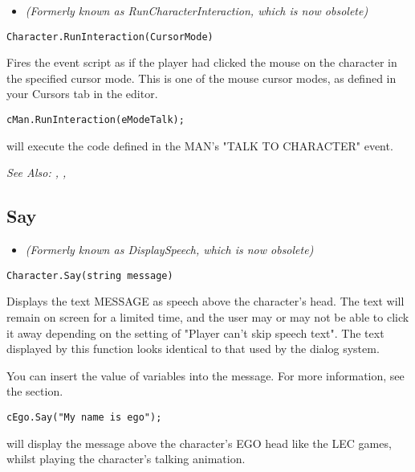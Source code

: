\begin{itemize}
\item \it{(Formerly known as RunCharacterInteraction, which is now obsolete)}
\end{itemize}

\begin{verbatim}
Character.RunInteraction(CursorMode)
\end{verbatim}
Fires the event script as if the player had clicked the mouse on the character
in the specified cursor mode. This is one of the mouse cursor
modes, as defined in your Cursors tab in the editor.

\begin{verbatim}
cMan.RunInteraction(eModeTalk);
\end{verbatim}
will execute the code defined in the MAN's "TALK TO CHARACTER" event.

\it{See Also:} , ,


\subsection{Say}\label{Character.Say}%

\begin{itemize}
\item \it{(Formerly known as DisplaySpeech, which is now obsolete)}
\end{itemize}

\begin{verbatim}
Character.Say(string message)
\end{verbatim}
Displays the text MESSAGE as speech above the character's head.
The text will remain on screen for a limited time, and the user may or may
not be able to click it away depending on the setting of "Player can't
skip speech text". The text displayed by this function looks identical to
that used by the dialog system.

You can insert the value of variables into the message. For more information,
see the  section.

\begin{verbatim}
cEgo.Say("My name is ego");
\end{verbatim}
will display the message above the character's EGO head like the LEC games,
whilst playing the character's talking animation.

